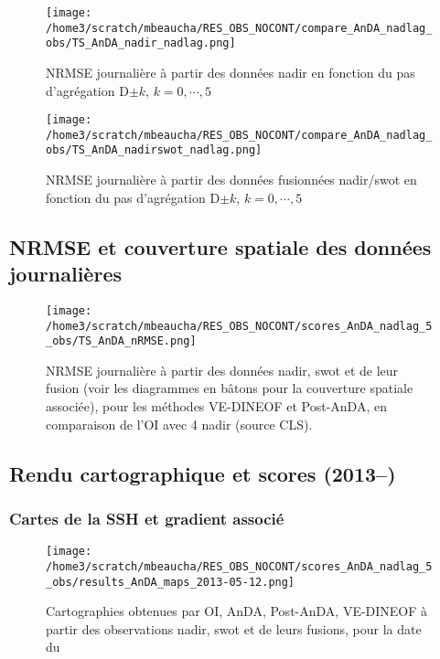 \documentclass[fleqn]{report}
\begin{document}
\begin{figure}[H]
  \centering
  \texttt{[image: /home3/scratch/mbeaucha/RES\_OBS\_NOCONT/compare\_AnDA\_nadlag\_obs/TS\_AnDA\_nadir\_nadlag.png]}
  \caption{NRMSE journalière à partir des données nadir en fonction du pas d'agrégation D$\pm k$, $k=0,\cdots,5$}
\end{figure} 

\begin{figure}[H]
  \centering
  \texttt{[image: /home3/scratch/mbeaucha/RES\_OBS\_NOCONT/compare\_AnDA\_nadlag\_obs/TS\_AnDA\_nadirswot\_nadlag.png]}
  \caption{NRMSE journalière à partir des données fusionnées nadir/swot en fonction du pas d'agrégation D$\pm k$, $k=0,\cdots,5$}
\end{figure} 

\subsection{NRMSE et couverture spatiale des données journalières}

\begin{figure}[H]
  \centering
  \texttt{[image: /home3/scratch/mbeaucha/RES\_OBS\_NOCONT/scores\_AnDA\_nadlag\_5\_obs/TS\_AnDA\_nRMSE.png]}
  \caption{NRMSE journalière à partir des données nadir, swot et de leur fusion (voir les diagrammes en bâtons pour la couverture spatiale associée), pour les méthodes VE-DINEOF et Post-AnDA, en comparaison de l'OI avec 4 nadir (source CLS).}
\end{figure} 

\subsection{Rendu cartographique et scores (2013--) } 

\subsubsection{Cartes de la SSH et gradient associé}

\begin{figure}[H]
  \hspace{-2cm}\texttt{[image: /home3/scratch/mbeaucha/RES\_OBS\_NOCONT/scores\_AnDA\_nadlag\_5\_obs/results\_AnDA\_maps\_2013-05-12.png]}
  \caption{Cartographies obtenues par OI, AnDA, Post-AnDA, VE-DINEOF à partir des observations nadir, swot et de leurs fusions, pour la date du }
\end{figure} 
\end{document}

